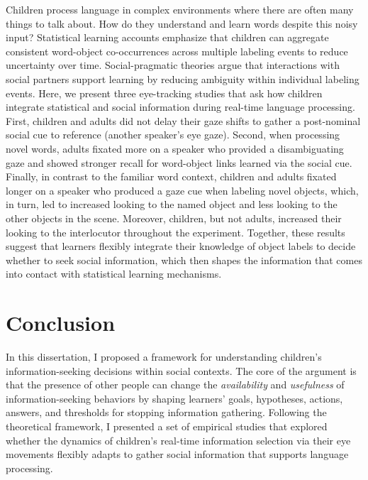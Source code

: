 \documentclass[oneside]{report}
\begin{document}
Children process language in complex environments where there are often
many things to talk about. How do they understand and learn words
despite this noisy input? Statistical learning accounts emphasize that
children can aggregate consistent word-object co-occurrences across
multiple labeling events to reduce uncertainty over time.
Social-pragmatic theories argue that interactions with social partners
support learning by reducing ambiguity within individual labeling
events. Here, we present three eye-tracking studies that ask how
children integrate statistical and social information during real-time
language processing. First, children and adults did not delay their gaze
shifts to gather a post-nominal social cue to reference (another
speaker's eye gaze). Second, when processing novel words, adults fixated
more on a speaker who provided a disambiguating gaze and showed stronger
recall for word-object links learned via the social cue. Finally, in
contrast to the familiar word context, children and adults fixated
longer on a speaker who produced a gaze cue when labeling novel objects,
which, in turn, led to increased looking to the named object and less
looking to the other objects in the scene. Moreover, children, but not
adults, increased their looking to the interlocutor throughout the
experiment. Together, these results suggest that learners flexibly
integrate their knowledge of object labels to decide whether to seek
social information, which then shapes the information that comes into
contact with statistical learning mechanisms.

\chapter*{Conclusion}\label{conclusion}

In this dissertation, I proposed a framework for understanding
children's information-seeking decisions within social contexts. The
core of the argument is that the presence of other people can change the
\emph{availability} and \emph{usefulness} of information-seeking
behaviors by shaping learners' goals, hypotheses, actions, answers, and
thresholds for stopping information gathering. Following the theoretical
framework, I presented a set of empirical studies that explored whether
the dynamics of children's real-time information selection via their eye
movements flexibly adapts to gather social information that supports
language processing.
\end{document}

